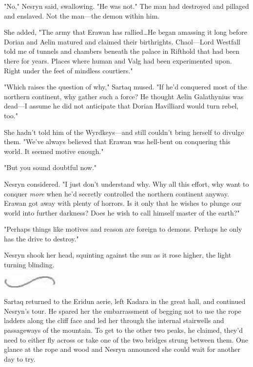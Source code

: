 "No," Nesryn said, swallowing.
"He was not."
The man had destroyed and pillaged and enslaved.
Not the man---the demon within him.

She added, "The army that Erawan has rallied\ldots He began amassing it long before Dorian and Aelin matured and claimed their birthrights.
Chaol---Lord Westfall told me of tunnels and chambers beneath the palace in Rifthold that had been there for years.
Places where human and Valg had been experimented upon.
Right under the feet of mindless courtiers."

"Which raises the question of why," Sartaq mused.
"If he'd conquered most of the northern continent, why gather such a force?
He thought Aelin Galathynius was dead---I assume he did not anticipate that Dorian Havilliard would turn rebel, too."

She hadn't told him of the Wyrdkeys---and still couldn't bring herself to divulge them.
"We've always believed that Erawan was hell-bent on conquering this world.
It seemed motive enough."

"But you sound doubtful now."

Nesryn considered.
"I just don't understand why.
Why all this effort, why want to conquer \emph{more} when he'd secretly controlled the northern continent anyway.
Erawan got away with plenty of horrors.
Is it only that he wishes to plunge our world into further darkness?
Does he wish to call himself master of the earth?"

"Perhaps things like motives and reason are foreign to demons.
Perhaps he only has the drive to destroy."

Nesryn shook her head, squinting against the sun as it rose higher, the light turning blinding.

\begin{center}
	\includegraphics[width=1.12in,height=0.24in]{images/seperator}
\end{center}

Sartaq returned to the Eridun aerie, left Kadara in the great hall, and continued Nesryn's tour.
He spared her the embarrassment of begging not to use the rope ladders along the cliff face and led her through the internal stairwells and passageways of the mountain.
To get to the other two peaks, he claimed, they'd need to either fly across or take one of the two bridges strung between them.
One glance at the rope and wood and Nesryn announced she could wait for another day to try.

